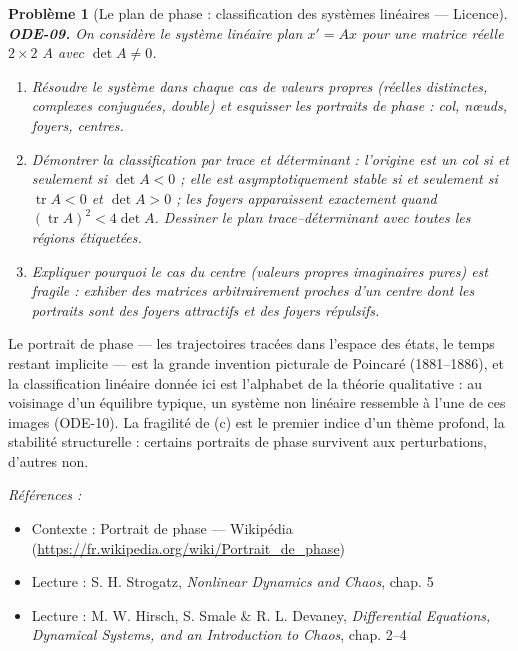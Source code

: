 \documentclass[11pt]{article}
\newtheorem{problem}{Problème}
\newenvironment{refs}{\par\small\noindent\emph{Références :}\begin{itemize}\setlength\itemsep{0pt}}{\end{itemize}\normalsize}
\begin{document}
\begin{problem}[{Le plan de phase : classification des systèmes linéaires --- Licence}]
\textbf{ODE-09.} On considère le système linéaire plan $ x' = A x $ pour une matrice réelle
$ 2 \times 2 $ $ A $ avec $ \det A \ne 0 $.
\begin{enumerate}
\item[(a)] Résoudre le système dans chaque cas de valeurs propres (réelles distinctes, complexes
conjuguées, double) et esquisser les portraits de phase : col, n\oe{}uds, foyers, centres.
\item[(b)] Démontrer la classification par trace et déterminant : l'origine est un col si et seulement
si $ \det A <0 $ ; elle est asymptotiquement stable si et seulement si
$ \operatorname{tr} A <0 $ et $ \det A >0 $ ; les foyers apparaissent exactement quand
$ (\operatorname{tr} A)^2 <4 \det A $. Dessiner le plan trace--déterminant avec toutes les
régions étiquetées.
\item[(c)] Expliquer pourquoi le cas du centre (valeurs propres imaginaires pures) est \textit{fragile} :
exhiber des matrices arbitrairement proches d'un centre dont les portraits sont des foyers
attractifs et des foyers répulsifs.
\end{enumerate}

\end{problem}

\noindent Le portrait de phase --- les trajectoires tracées dans l'espace des états, le
temps restant implicite --- est la grande invention picturale de Poincaré (1881--1886), et la
classification linéaire donnée ici est l'alphabet de la théorie qualitative : au voisinage d'un
équilibre typique, un système non linéaire ressemble à l'une de ces images (ODE-10). La fragilité
de (c) est le premier indice d'un thème profond, la stabilité structurelle : certains portraits
de phase survivent aux perturbations, d'autres non.

\begin{refs}
\item Contexte : Portrait de phase --- Wikipédia (\url{https://fr.wikipedia.org/wiki/Portrait_de_phase})
\item Lecture : S. H. Strogatz, \textit{Nonlinear Dynamics and Chaos}, chap. 5
\item Lecture : M. W. Hirsch, S. Smale \& R. L. Devaney, \textit{Differential Equations, Dynamical Systems, and an Introduction to Chaos}, chap. 2--4
\end{refs}

\bigskip
\end{document}
